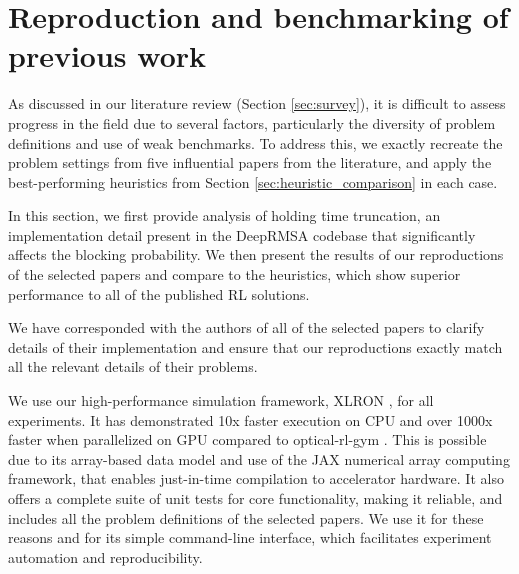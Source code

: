 \section{Reproduction and benchmarking of previous work}
\label{sec:repro_main}

As discussed in our literature review (Section \ref{sec:survey}), it is difficult to assess progress in the field due to several factors, particularly the diversity of problem definitions and use of weak benchmarks. To address this, we exactly recreate the problem settings from five influential papers from the literature, and apply the best-performing heuristics from Section \ref{sec:heuristic_comparison} in each case.

In this section, we first provide analysis of holding time truncation, an implementation detail present in the DeepRMSA codebase that significantly affects the blocking probability. We then present the results of our reproductions of the selected papers and compare to the heuristics, which show superior performance to all of the published RL solutions.

We have corresponded with the authors of all of the selected papers to clarify details of their implementation and ensure that our reproductions exactly match all the relevant details of their problems.


 We use our high-performance simulation framework, \mbox{XLRON} \cite{doherty_xlron_2023}, for all experiments. It has demonstrated 10x faster execution on CPU and over 1000x faster when parallelized on GPU compared to optical-rl-gym \cite{doherty_xlron_2024}. This is possible due to its array-based data model and use of the JAX numerical array computing framework, that enables just-in-time compilation to accelerator hardware. It also offers a complete suite of unit tests for core functionality, making it reliable, and includes all the problem definitions of the selected papers. We use it for these reasons and for its simple command-line interface, which facilitates experiment automation and reproducibility.













